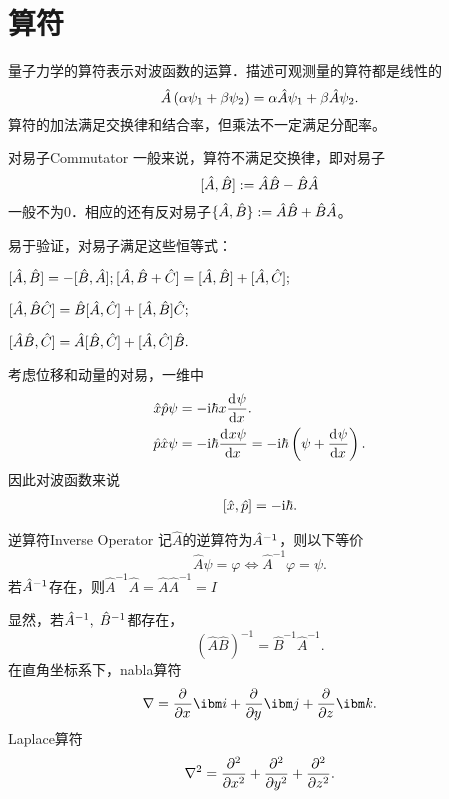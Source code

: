 \chapter{算符}
量子力学的算符表示对波函数的运算．描述可观测量的算符都是线性的
\[
	\hat A\kh{\alpha\psi_1+\beta\psi_2}=\alpha\hat A\psi_1+\beta\hat A\psi_2.
\]
算符的加法满足交换律和结合率，但乘法不一定满足分配率。
\begin{definition}{对易子}{Commutator}
	一般来说，算符不满足交换律，即对易子
	\[
		\cmm AB:=\hat A\hat B-\hat B\hat A
	\]
	一般不为0．相应的还有反对易子$\acmm AB:=\hat A\hat B+\hat B\hat A$。
\end{definition}
易于验证，对易子满足这些恒等式：
\begin{compactenum}
	\item $\cmm AB=-\cmm BA;$\qquad$[\hat A,\hat B+\hat C]=\cmm AB+\cmm AC;$
	\item $[\hat A,\hat B\hat C]=\hat B\cmm AC+\cmm AB\hat C;$
	\item $[\hat A\hat B,\hat C]=\hat A\cmm BC+\cmm AC\hat B.$
\end{compactenum}

考虑位移和动量的对易，一维中
\begin{align*}
	\hat x\hat p\psi & =-\i\hbar x\dv\psi{x}.                             \\
	\hat p\hat x\psi & =-\i\hbar\dv{x\psi}x=-\i\hbar\kh{\psi+\dv\psi{x}}.
\end{align*}
因此对波函数来说
\begin{align}
	\cmm xp=-\i\hbar.
\end{align}
\begin{definition}{逆算符}{Inverse Operator}
	记$\hat A$的逆算符为$\hat A\iv$，则以下等价
	\[
		\hat A\psi=\varphi\iff\hat A^{-1}\varphi=\psi.
	\]
	若$\hat A\iv$存在，则$\hat A^{-1}\hat A=\hat A\hat A^{-1}=I$
\end{definition}
显然，若$\hat A\iv,\;\hat B\iv$都存在，
\[
	(\hat A\hat B)^{-1}=\hat B^{-1}\hat A^{-1}.
\]
\iffalse
	在直角坐标系下，nabla算符
	\[
		\nabla=\pp x\ibm i+\pp y\ibm j+\pp z\ibm k.
	\]
	Laplace算符
	\[
		\nabla^2=\pp[2]x+\pp[2]y+\pp[2]z.
	\]

